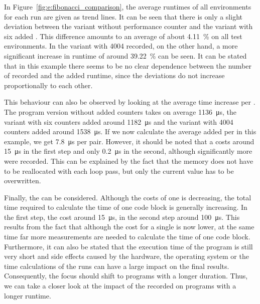 In Figure~\ref{fig:e:fibonacci_comparison}, the average runtimes of all environments for each run are given as trend lines. It can be seen that there is only a slight deviation between the variant without performance counter and the variant with six added \MEASUREVALUES. This difference amounts to an average of about \SI{4.11}{\percent} on all test environments. In the variant with 4004 \MEASUREVALUE recorded, on the other hand, a more significant increase in runtime of around \SI{39.22}{\percent} can be seen. It can be stated that in this example there seems to be no clear dependence between the number of \MEASUREVALUES recorded and the added runtime, since the deviations do not increase proportionally to each other. 

This behaviour can also be observed by looking at the average time increase per \MEASUREPAIR. The program version without added counters takes on average \SI{1136}{\micro\second}, the variant with six counters added around \SI{1182}{\micro\second} and the variant with 4004 counters added around \SI{1538}{\micro\second}. If we now calculate the average added per \MEASUREPAIR in this example, we get \SI{7,8}{\micro\second} per pair. However, it should be noted that a \MEASUREPAIR costs around \SI{15}{\micro\second} in the first step and only \SI{0.2}{\micro\second} in the second, although significantly more \MEASUREVALUES were recorded. This can be explained by the fact that the memory does not have to be reallocated with each loop pass, but only the current value has to be overwritten. 

Finally, the \TOTALCODEBLOCK can be considered. Although the costs of one \MEASUREPAIR is decreasing, the total time required to calculate the time of one code block is generally increasing. In the first step, the \TOTALCODEBLOCK cost around \SI{15}{\micro\second}, in the second step around \SI{100}{\micro\second}. This results from the fact that although the cost for a single \MEASUREVALUE is now lower, at the same time far more measurements are needed to calculate the time of one code block. Furthermore, it can also be stated that the execution time of the program is still very short and side effects caused by the hardware, the operating system or the time calculations of the runs can have a large impact on the final results. Consequently, the focus should shift to programs with a longer duration. Thus, we can take a closer look at the impact of the \MEASUREVALUES recorded on programs with a longer runtime.

